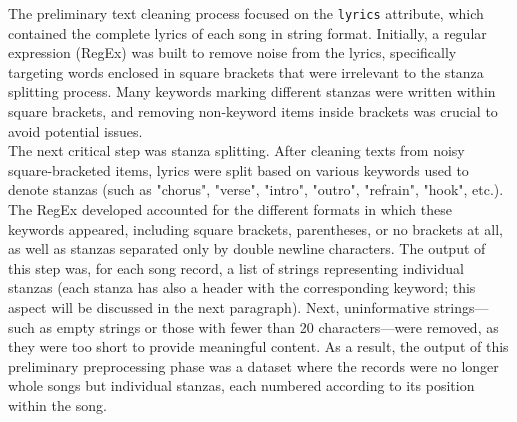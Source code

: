 The preliminary text cleaning process focused on the \texttt{lyrics} attribute,
which contained the complete lyrics of each song in string format.
Initially, a regular expression (RegEx) was built to remove noise from the
lyrics, specifically targeting words enclosed in square brackets that were
irrelevant to the stanza splitting process. Many keywords marking different
stanzas were written within square brackets, and removing non-keyword items
inside brackets was crucial to avoid potential issues.\\

The next critical step was stanza splitting. After cleaning texts from
noisy square-bracketed items, lyrics were split based on various keywords
used to denote stanzas (such as "chorus", "verse", "intro", "outro", "refrain", "hook", etc.).
The RegEx developed accounted for the different formats in which these keywords
appeared, including square brackets, parentheses, or no brackets at all, as well
as stanzas separated only by double newline characters.
The output of this step was, for each song record, a list of strings
representing individual stanzas (each stanza has also a header with the corresponding
keyword; this aspect will be discussed in the next paragraph).
Next, uninformative strings—such as empty strings or those with fewer
than 20 characters—were removed, as they were too short to provide meaningful
content.
As a result, the output of this preliminary preprocessing phase was a dataset
where the records were no longer whole songs but individual stanzas, each
numbered according to its position within the song.\\



